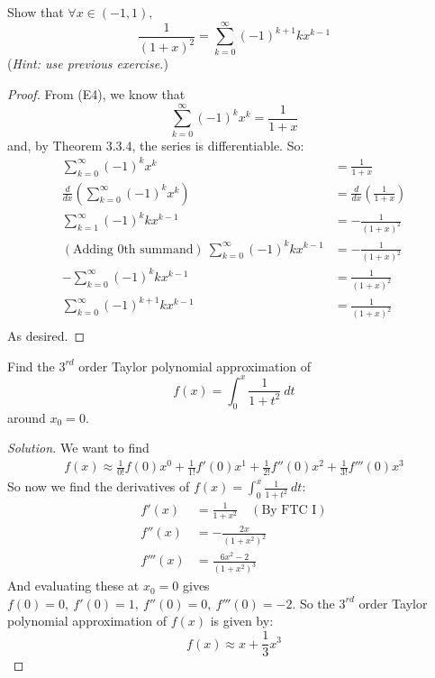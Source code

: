 \documentclass{article}
\newcommand{\parens}[1]{\left(#1\right)}
\begin{document}
	\item Show that $\forall x \in (-1,1),$
	$$\frac{1}{\parens{1+x}^2} = \sum_{k=0}^\infty (-1)^{k+1} kx^{k-1}$$
	(\emph{Hint: use previous exercise.})
	\begin{proof}
	From (E4), we know that 
	$$\sum_{k=0}^\infty (-1)^k x^k = \frac{1}{1+x}$$ 
	and, by Theorem 3.3.4, the series is differentiable. So:
	\begin{align*}
	\sum_{k=0}^\infty (-1)^k x^k &= \frac{1}{1+x}\\
	\frac{d}{dx}\parens{\sum_{k=0}^\infty (-1)^k x^k} &= \frac{d}{dx}\parens{\frac{1}{1+x}}\\
	\sum_{k=1}^\infty (-1)^k kx^{k-1} &= -\frac{1}{\parens{1+x}^2}\\
(\text{Adding 0th summand})\ 	\sum_{k=0}^\infty (-1)^k kx^{k-1} &= -\frac{1}{\parens{1+x}^2}\\
	-\sum_{k=0}^\infty (-1)^k kx^{k-1} &= \frac{1}{\parens{1+x}^2}\\
	\sum_{k=0}^\infty (-1)^{k+1} kx^{k-1} &= \frac{1}{\parens{1+x}^2}\\
	\end{align*}
	As desired.
	\end{proof}
	
	\item Find the $3^{rd}$ order Taylor polynomial approximation of $$f(x) = \int_0^x \frac{1}{1+t^2}\ dt$$
	around $x_0 = 0$.
	\begin{proof}[Solution]
	We want to find 
	\begin{align*}
	f(x) \approx \frac{1}{0!}f(0)x^0 + \frac{1}{1!}f'(0)x^1 + \frac{1}{2!}f''(0)x^2 + \frac{1}{3!}f'''(0)x^3
	\end{align*}
	So now we find the derivatives of $f(x) = \int_0^x \frac{1}{1+t^2}\ dt$:
	\begin{align*}
	f'(x) &= \frac{1}{1+x^2}\quad (\text{By FTC I})\\
	f''(x) &= -\frac{2x}{\parens{1+x^2}^2}\\
	f'''(x) &= \frac{6x^2-2}{\parens{1+x^2}^3}
	\end{align*}
	And evaluating these at $x_0 = 0$ gives $f(0) = 0,\ f'(0) = 1,\ f''(0) = 0,\ f'''(0) = -2$. So the $3^{rd}$ order Taylor polynomial approximation of $f(x)$ is given by:
	$$f(x) \approx x + \frac{1}{3}x^3$$
	
	\end{proof}
	
\end{document}
